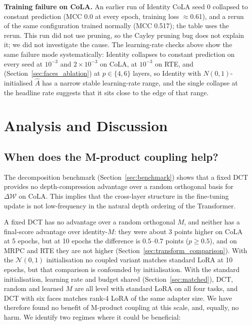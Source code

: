 \documentclass{article}
\newcommand{\DeltaW}{\Delta\mathcal{W}}
\theoremstyle{plain}
\begin{document}
\textbf{Training failure on CoLA.}
An earlier run of Identity CoLA seed 0 collapsed to constant prediction (MCC 0.0 at every epoch, training loss
$\approx$0.61), and a rerun of the same configuration trained normally (MCC 0.517); the table uses the rerun.
This run did not use pruning, so the Cayley pruning bug does not explain it; we did not investigate the cause.
The learning-rate checks above show the same failure mode systematically: Identity collapses to constant prediction on every seed at
$10^{-3}$ and $2\times10^{-3}$ on CoLA, at $10^{-3}$ on RTE, and (Section~\ref{sec:faces_ablation}) at $p\in\{4,6\}$ layers, so
Identity with $N(0,1)$-initialised $\hat A$ has a narrow stable learning-rate range, and the single collapse at the headline rate suggests that it sits close to the edge of that range.

\section{Analysis and Discussion}
\label{sec:analysis}

\subsection{When does the M-product coupling help?}
\label{sec:analysis_coupling}

The decomposition benchmark (Section~\ref{sec:benchmark}) shows that a fixed DCT
provides no depth-compression advantage over a random orthogonal basis for
$\DeltaW$ on CoLA.
This implies that the cross-layer structure in the fine-tuning update is not
low-frequency in the natural depth ordering of the Transformer.

A fixed DCT has no advantage over a random orthogonal $M$, and neither has a final-score advantage over identity-$M$: they were about 3 points higher
on CoLA at 5 epochs, but at 10 epochs the difference is $0.5$--$0.7$ points ($p\ge0.5$), and on MRPC and RTE they are not higher
(Section~\ref{sec:transform_comparison}).
With the $\mathcal{N}(0,1)$ initialisation no coupled variant matches standard LoRA at 10 epochs, but that comparison is confounded by initialisation.
With the standard initialisation, learning rate and budget shared (Section~\ref{sec:matched}), DCT, random and learned $M$ are all level with standard LoRA on all four tasks, and
DCT with six faces matches rank-4 LoRA of the same adapter size.
We have therefore found no benefit of M-product coupling at this scale, and, equally, no harm.
We identify two regimes where it could be beneficial:
\end{document}
